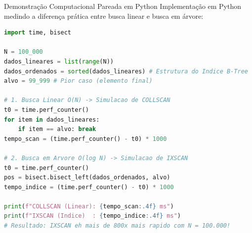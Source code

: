 \begin{frame}[fragile]{Demonstração Computacional Pareada em Python}
  \vspace{0.05cm}
  \scriptsize
  Implementação em Python medindo a diferença prática entre busca linear e busca em árvore:
  \begin{lstlisting}[language=Python]
import time, bisect

N = 100_000
dados_lineares = list(range(N))
dados_ordenados = sorted(dados_lineares) # Estrutura do Indice B-Tree
alvo = 99_999 # Pior caso (elemento final)

# 1. Busca Linear O(N) -> Simulacao de COLLSCAN
t0 = time.perf_counter()
for item in dados_lineares:
    if item == alvo: break
tempo_scan = (time.perf_counter() - t0) * 1000

# 2. Busca em Arvore O(log N) -> Simulacao de IXSCAN
t0 = time.perf_counter()
pos = bisect.bisect_left(dados_ordenados, alvo)
tempo_indice = (time.perf_counter() - t0) * 1000

print(f"COLLSCAN (Linear): {tempo_scan:.4f} ms")
print(f"IXSCAN (Indice)  : {tempo_indice:.4f} ms")
# Resultado: IXSCAN eh mais de 800x mais rapido com N = 100.000!
  \end{lstlisting}
\end{frame}
